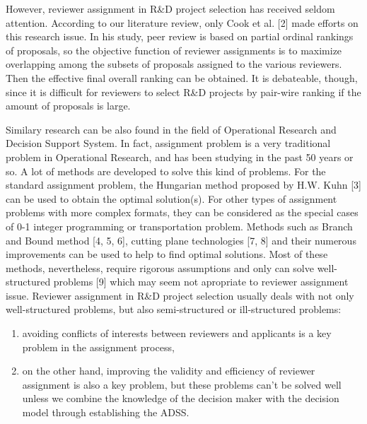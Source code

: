 \documentclass{elsarticle}
\begin{document}
However, reviewer assignment in R\&D project selection has received
seldom attention. According to our literature review, only Cook et
al. [2] made efforts on this research issue. In his study, peer review
is based on partial ordinal rankings of proposals, so the objective
function of reviewer assignments is to maximize overlapping among the
subsets of proposals assigned to the various reviewers. Then the
effective final overall ranking can be obtained. It is debateable, though, since it is difficult for reviewers to select R\&D projects by pair-wire ranking if the amount of proposals is large. %


Similary research can be also found in the field of Operational
Research and Decision Support System. In fact, assignment problem is a
very traditional problem in Operational Research, and has been
studying in the past 50 years or so. A lot of methods are developed to
solve this kind of problems. For the standard assignment problem, the
Hungarian method proposed by H.W. Kuhn [3] can be used to obtain the
optimal solution(s). For other types of assignment problems with more
complex formats, they can be considered as the special cases of 0-1
integer programming or transportation problem. Methods such as Branch
and Bound method [4, 5, 6], cutting plane technologies [7, 8] and
their numerous improvements can be used to help to find optimal
solutions. Most of these methods, nevertheless, require rigorous
assumptions and only can solve well-structured problems [9] which may
seem not apropriate to reviewer assignment issue. Reviewer assignment
in R\&D project selection usually deals with not only well-structured
problems, but also semi-structured or ill-structured problems:
\begin{enumerate}
\item  avoiding conflicts of interests between reviewers and
  applicants is a key problem in the assignment process,
\item  on the other hand, improving the validity and efficiency of reviewer assignment is also a key problem, but these problems can’t be solved well unless we combine the knowledge of the decision maker with the decision model through establishing the ADSS.
  
\end{enumerate}
\end{document}
